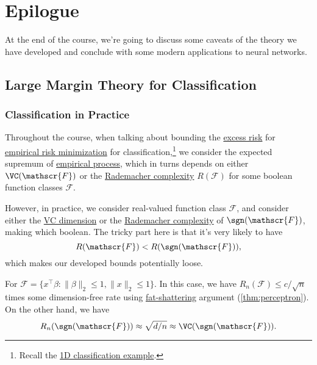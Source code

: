 \chapter{Epilogue}
At the end of the course, we're going to discuss some caveats of the theory we have developed and conclude with some modern applications to neural networks.

\section{Large Margin Theory for Classification}
\subsection{Classification in Practice}
Throughout the course, when talking about bounding the \hyperref[def:excess-risk]{excess risk} for \hyperref[prb:ERM]{empirical risk minimization} for classification,\footnote{Recall the \hyperref[eg:1D-classification-thresholds]{1D classification example}.} we consider the expected supremum of \hyperref[def:EP]{empirical process}, which in turns depends on either \(\VC(\mathscr{F} )\) or the \hyperref[def:Rademacher-complexity]{Rademacher complexity} \(R(\mathscr{F} )\) for some boolean function classes \(\mathscr{F} \).

However, in practice, we consider real-valued function class \(\mathscr{F} \), and consider either the \hyperref[def:VC-dimension]{VC dimension} or the \hyperref[def:Rademacher-complexity]{Rademacher complexity} of \(\sgn (\mathscr{F} )\), making which boolean. The tricky part here is that it's very likely to have
\[
	R(\mathscr{F} ) < R(\sgn (\mathscr{F} )),
\]
which makes our developed bounds potentially loose.

\begin{eg}
	For \(\mathscr{F} = \{ x^{\top} \beta \colon \lVert \beta \rVert _2 \leq 1, \lVert x \rVert _2 \leq 1 \} \). In this case, we have \(R_n(\mathscr{F} ) \leq c / \sqrt{n} \) times some dimension-free rate using \hyperref[def:fat-shattering-dimension]{fat-shattering} argument (\autoref{thm:perceptron}). On the other hand, we have
	\[
		R_n(\sgn (\mathscr{F} )) \approx \sqrt{d / n} \approx \VC(\sgn (\mathscr{F} )).
	\]
\end{eg}

